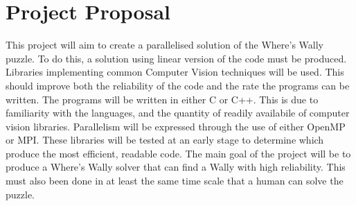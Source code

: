 \documentclass[../main.tex]{subfiles}
\begin{document}
  \section{Project Proposal}
    This project will aim to create a parallelised solution of the Where's Wally puzzle.
    To do this, a solution using linear version of the code must be produced.
    Libraries implementing common Computer Vision techniques will be used.
    This should improve both the reliability of the code and the rate the programs can be written.
    The programs will be written in either C or C++.
    This is due to familiarity with the languages, and the quantity of readily availabile of computer vision libraries.
    Parallelism will be expressed through the use of either OpenMP or MPI.
    These libraries will be tested at an early stage to determine which produce the most efficient, readable code.
    The main goal of the project will be to produce a Where's Wally solver that can find a Wally with high reliability.
    This must also been done in at least the same time scale that a human can solve the puzzle.
\end{document}

